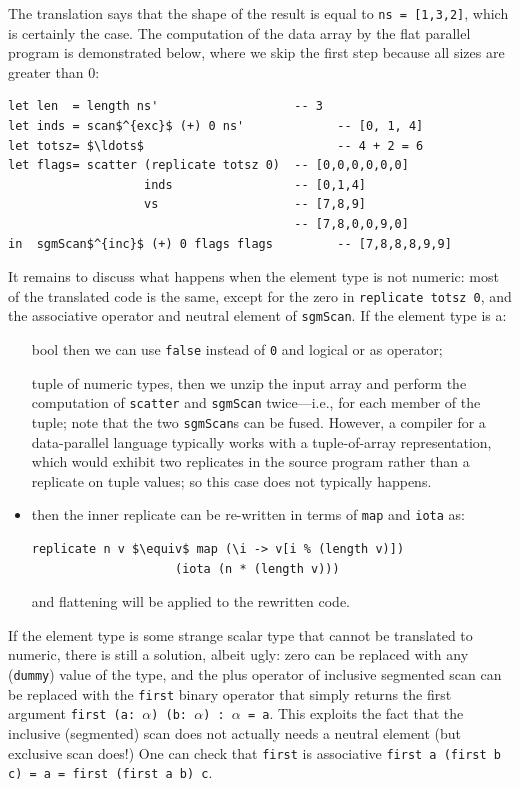 \documentclass[acmsmall,review]{acmart}\settopmatter{printfolios=true,printccs=false,printacmref=false}
\begin{document}
The translation says that the shape of the result is
equal to {\tt ns = [1,3,2]}, which is certainly the case.
The computation of the data array by the flat parallel program is
demonstrated below, where we skip the first step because all sizes
are greater than $0$:
\begin{lstlisting}[mathescape=true]
let len  = length ns'                   -- 3
let inds = scan$^{exc}$ (+) 0 ns'             -- [0, 1, 4]
let totsz= $\ldots$                           -- 4 + 2 = 6 
let flags= scatter (replicate totsz 0)  -- [0,0,0,0,0,0]
                   inds                 -- [0,1,4]
                   vs                   -- [7,8,9]
                                        -- [7,8,0,0,9,0]
in  sgmScan$^{inc}$ (+) 0 flags flags         -- [7,8,8,8,9,9]
\end{lstlisting}\vspace{-2ex}

It remains to discuss what happens when the element type is not numeric:
most of the translated code is the same, except for the zero in 
\lstinline{replicate totsz 0}, and the associative operator and neutral
element of \lstinline{sgmScan}.
If the element type is a:
\begin{itemize}
    \item[bool] then we can use {\tt false} instead of {\tt 0}
            and logical or as operator;
    \item[tuple] of numeric types, then we unzip the input array 
        and perform the computation of \lstinline{scatter} and 
        \lstinline{sgmScan} twice---i.e., for each member of the tuple;
        note that the two \lstinline{sgmScan}s can be fused.
        However, a compiler for a data-parallel language typically
        works with a tuple-of-array representation, which would
        exhibit two replicates in the source program rather than
        a replicate on tuple values; so this case does not typically
        happens.
    \item[array] then the inner replicate can be re-written in terms of
        {\tt map} and {\tt iota} as:
\begin{lstlisting}[mathescape=true]
replicate n v $\equiv$ map (\i -> v[i % (length v)]) 
                    (iota (n * (length v)))
\end{lstlisting}\vspace{-2ex}
        and flattening will be applied to the rewritten code.
\end{itemize}

If the element type is some strange scalar type that cannot be translated
to numeric, there is still a solution, albeit ugly: zero can be
replaced with any ({\tt dummy}) value of the type, and the plus
operator of inclusive segmented scan can be replaced with the 
{\tt first} binary operator that simply returns the first argument 
{\tt first (a: $\alpha$) (b: $\alpha$) : $\alpha$ = a}.
This exploits the fact that the inclusive (segmented) scan does
not actually needs a neutral element (but exclusive scan does!)
One can check that {\tt first} is associative 
{\tt first a (first b c) = a = first (first a b) c}.
\end{document}
